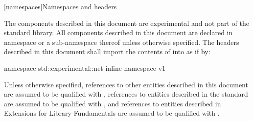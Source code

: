 
[namespaces]{Namespaces and headers}

\pnum
The components described in this document are experimental and not part of the \Cpp standard library. All components described in this document are declared in namespace  or a sub-namespace thereof unless otherwise specified. The headers described in this document shall import the contents of  into  as if by:

\begin{codeblock}
namespace std::experimental::net {
      inline namespace v1 {}
}
\end{codeblock}

\pnum
Unless otherwise specified, references to other entities described in this document are assumed to be qualified with , references to entities described in the \Cpp standard are assumed to be qualified with , and references to entities described in \Cpp Extensions for Library Fundamentals are assumed to be qualified with .


